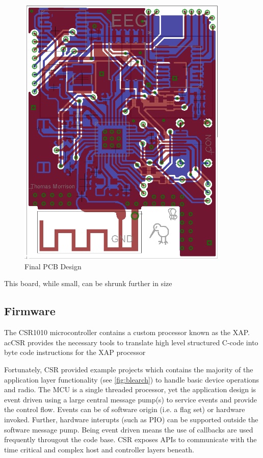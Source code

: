 \documentclass[]{article}
\begin{document}
\begin{figure}[htb]
	\begin{center}
		\includegraphics[width = 0.9\textwidth]{boardfinal}
	\end{center}
	\caption{Final PCB Design}
	\label{fig:boardfinal}
\end{figure}

This board, while small, can be shrunk further in size



\clearpage
\subsection{Firmware}

The CSR1010 microcontroller contains a custom processor known as the XAP. ac{CSR} provides the necessary tools to translate high level structured C-code into byte code instructions for the XAP processor

Fortunately, \ac{CSR} provided example projects which contains the majority of the application layer functionality (see \ref{fig:blearch}) to handle basic device operations and radio. The \ac{MCU} is a single threaded processor, yet the application design is event driven using a large central message pump(s) to service events and provide the control flow. Events can be of software origin (i.e. a flag set) or hardware invoked. Further, hardware interupts (such as PIO) can be supported outside the software message pump. Being event driven means the use of callbacks are used frequently througout the code base. \ac{CSR} exposes \ac{API}s to communicate with the time critical and complex host and controller layers beneath.
\end{document}

